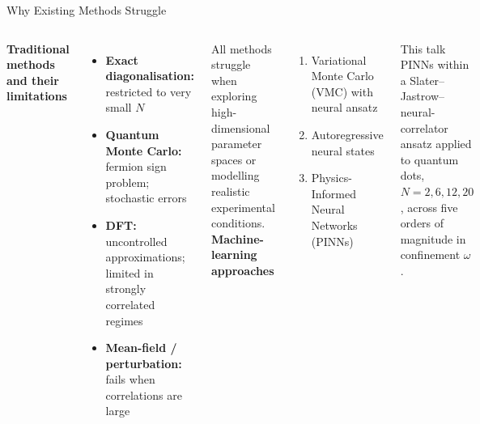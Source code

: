 \documentclass[aspectratio=169,10pt]{beamer}
\begin{document}
\begin{frame}{Why Existing Methods Struggle}
  \begin{columns}[T]
      \textbf{Traditional methods and their limitations}
      \begin{itemize}
        \item \textbf{Exact diagonalisation:} restricted to very small $N$
        \item \textbf{Quantum Monte Carlo:} fermion sign problem;
              stochastic errors
        \item \textbf{DFT:} uncontrolled approximations; limited in
              strongly correlated regimes
        \item \textbf{Mean-field / perturbation:} fails when correlations
              are large
      \end{itemize}
      \vspace{0.3cm}
      All methods struggle when exploring high-dimensional parameter
      spaces or modelling realistic experimental conditions.
      \textbf{Machine-learning approaches}
      \begin{enumerate}
        \item Variational Monte Carlo (VMC) with neural ansatz
        \item Autoregressive neural states
        \item \alert{Physics-Informed Neural Networks (PINNs)}
      \end{enumerate}
      \vspace{0.4cm}
      \begin{block}{This talk}
        PINNs within a Slater--Jastrow--neural-correlator ansatz applied
        to quantum dots, $N = 2, 6, 12, 20$, across five orders of
        magnitude in confinement $\omega$.
      \end{block}
  \end{columns}
\end{frame}
\end{document}

